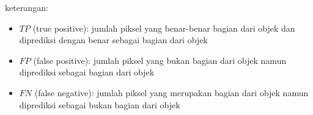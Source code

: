 \noindent
keterangan:
\begin{itemize}
	\item $TP$ (true positive): jumlah piksel yang benar-benar bagian dari objek dan diprediksi dengan benar sebagai bagian dari objek
	\item $FP$ (false positive): jumlah piksel yang bukan bagian dari objek namun diprediksi sebagai bagian dari objek
	\item $FN$ (false negative): jumlah piksel yang merupakan bagian dari objek namun diprediksi sebagai bukan bagian dari objek
\end{itemize}


